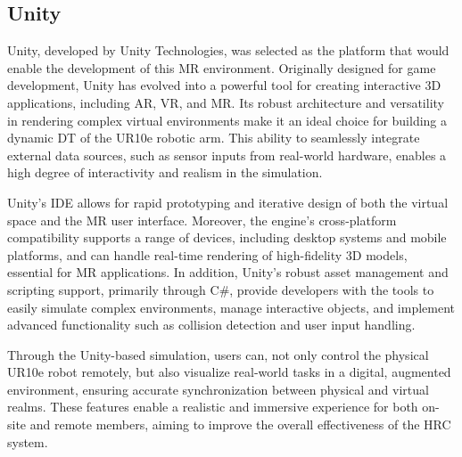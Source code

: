 \subsection{Unity}

Unity, developed by Unity Technologies, was selected as the platform that would enable the development of this \ac{MR} environment. Originally designed for game development, Unity has evolved into a powerful tool for creating interactive 3D applications, including \ac{AR}, \ac{VR}, and \ac{MR}. Its robust architecture and versatility in rendering complex virtual environments make it an ideal choice for building a dynamic \ac{DT} of the UR10e robotic arm. This ability to seamlessly integrate external data sources, such as sensor inputs from real-world hardware, enables a high degree of interactivity and realism in the simulation.

Unity’s \ac{IDE} allows for rapid prototyping and iterative design of both the virtual space and the \ac{MR} user interface. Moreover, the engine's cross-platform compatibility supports a range of devices, including desktop systems and mobile platforms, and can handle real-time rendering of high-fidelity 3D models, essential for \ac{MR} applications. In addition, Unity’s robust asset management and scripting support, primarily through C\#, provide developers with the tools to easily simulate complex environments, manage interactive objects, and implement advanced functionality such as collision detection and user input handling.

Through the Unity-based simulation, users can, not only control the physical UR10e robot remotely, but also visualize real-world tasks in a digital, augmented environment, ensuring accurate synchronization between physical and virtual realms. These features enable a realistic and immersive experience for both on-site and remote members, aiming to improve the overall effectiveness of the \ac{HRC} system.




